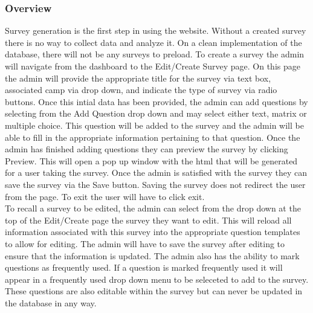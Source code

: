 \documentclass[../final.tex]{subfiles}
\begin{document}
\subsubsection{Overview}
Survey generation is the first step in using the website. Without a created 
survey there is no way to collect data and analyze it. On a clean implementation 
of the database, there will not be any surveys to preload. To create a survey the 
admin will navigate from the dashboard to the Edit/Create Survey page. On this page 
the admin will provide the appropriate title for the survey via text box, associated 
camp via drop down, and indicate the type of survey via radio buttons. Once this 
intial data has been provided, the admin can add questions by selecting from the 
Add Question drop down and may select either text, matrix or multiple choice. This 
question will be added to the survey and the admin will be able to fill in the 
appropriate information pertaining to that question. Once the admin has finished adding 
questions they can preview the survey by clicking Preview. This will open a pop up 
window with the html that will be generated for a user taking the survey. Once the admin 
is satisfied with the survey they can save the survey via the Save button. Saving the 
survey does not redirect the user from the page. To exit the user will have to click 
exit. \\
To recall a survey to be edited, the admin can select from the drop down at the top 
of the Edit/Create page the survey they want to edit. This will reload all information 
associated with this survey into the appropriate question templates to allow for 
editing. The admin will have to save the survey after editing to ensure that the 
information is updated. The admin also has the ability to mark questions as frequently 
used. If a question is marked frequently used it will appear in a frequently used 
drop down menu to be seleceted to add to the survey. These questions are also editable 
within the survey but can never be updated in the database in any way. \\ 
\end{document}

